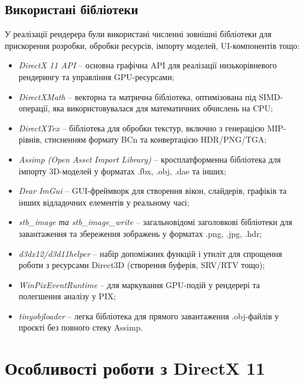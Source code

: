 \subsection{Використані бібліотеки}

У реалізації рендерера були використані численні зовнішні бібліотеки для прискорення розробки, обробки ресурсів, імпорту моделей, UI-компонентів тощо:

\begin{itemize}
    \item \emph{DirectX 11 API} -- основна графічна API для реалізації низькорівневого рендерингу та управління GPU-ресурсами;
    
    \item \emph{DirectXMath} -- векторна та матрична бібліотека, оптимізована під SIMD-операції, яка використовувалася для математичних обчислень на CPU;
    
    \item \emph{DirectXTex} -- бібліотека для обробки текстур, включно з генерацією MIP-рівнів, стисненням формату BCn та конвертацією HDR/PNG/TGA;
    
    \item \emph{Assimp (Open Asset Import Library)} -- кросплатформенна бібліотека для імпорту 3D-моделей у форматах .fbx, .obj, .dae та інших;
    
    \item \emph{Dear ImGui} -- GUI-фреймворк для створення вікон, слайдерів, графіків та інших відладочних елементів у реальному часі;
    
    \item \emph{stb\_image та stb\_image\_write} -- загальновідомі заголовкові бібліотеки для завантаження та збереження зображень у форматах .png, .jpg, .hdr;
    
    \item \emph{d3dx12/d3d11helper} -- набір допоміжних функцій і утиліт для спрощення роботи з ресурсами Direct3D (створення буферів, SRV/RTV тощо);
    
    \item \emph{WinPixEventRuntime} -- для маркування GPU-подій у рендерері та полегшення аналізу у PIX;
    
    \item \emph{tinyobjloader} -- легка бібліотека для прямого завантаження .obj-файлів у проєкті без повного стеку Assimp.
\end{itemize}

\section{Особливості роботи з DirectX 11}

